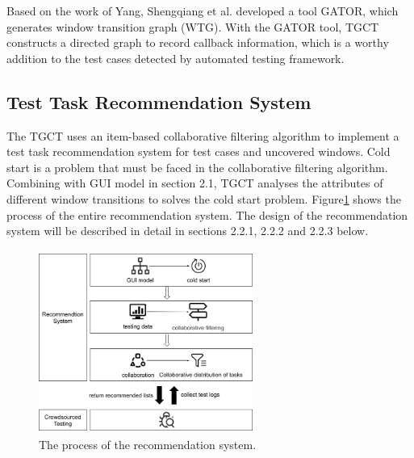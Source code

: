 Based on the work of Yang, Shengqiang et al.\cite{b5} developed a tool GATOR, which generates window transition graph (WTG). With the GATOR tool, TGCT constructs a directed graph to record callback information, which is a worthy addition to the test cases detected by automated testing framework.


\subsection{Test Task Recommendation System}
The TGCT uses an item-based collaborative filtering algorithm to implement a test task recommendation system for test cases and uncovered windows. Cold start is a problem that must be faced in the collaborative filtering algorithm. Combining with GUI model in section 2.1, TGCT analyses the attributes of different window transitions to solves the cold start problem. Figure\ref{fig:recomd} shows the process of the entire recommendation system. The design of the recommendation system will be described in detail in sections 2.2.1, 2.2.2 and 2.2.3 below.
\begin{figure}[htbp]
\centering
\centerline{\includegraphics[width=7cm,height=6cm]{fig/7.png}}
\caption{The process of the recommendation system.}
\label{fig:recomd}
\end{figure}
